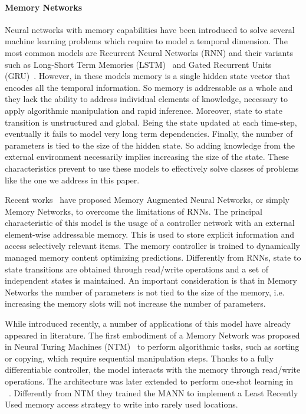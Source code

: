 \documentclass[10pt,twocolumn,letterpaper]{article}
\begin{document}
\paragraph{Memory Networks}
Neural networks with memory capabilities have been introduced to solve several machine learning problems which require to model a temporal dimension. The most common models are Recurrent Neural Networks (RNN) and their variants such as Long-Short Term Memories (LSTM)~\cite{hochreiter1997long} and Gated Recurrent Units (GRU)~\cite{cho2014learning}.
However, in these models memory is a single hidden state vector that encodes all the temporal information. So memory is addressable as a whole and they lack the ability to address individual elements of knowledge, necessary to apply algorithmic manipulation and rapid inference. Moreover, state to state transition is unstructured and global. Being the state updated at each time-step, eventually it fails to model very long term dependencies. Finally, the number of parameters is tied to the size of the hidden state. So adding knowledge from the external environment necessarily implies increasing the size of the state.
These characteristics prevent to use these models to effectively solve classes of problems like the one we address in this paper.

Recent works~\cite{kaiser2017learning, graves2014neural, santoro2016meta, sukhbaatar2015end, weston2014memory, rebuffi2017icarl, kumar2016ask, ma2018visual, yang2018learning, cai2018memory, vinyals2016matching, pritzel2017neural, xu2017few} have proposed Memory Augmented Neural Networks, or simply Memory Networks, to overcome the limitations of RNNs. The principal characteristic of this model is the usage of a controller network with an external element-wise addressable memory. This is used  to store explicit information and access selectively relevant items. The memory controller is trained to dynamically managed memory content optimizing predictions.  Differently from RNNs, state to state transitions are obtained through read/write operations and a set of independent states is maintained. An important consideration is that in Memory Networks the number of parameters is not tied to the size of the memory, i.e. increasing the memory slots will not increase the number of parameters. 

While introduced recently, a number of applications of this model have already appeared in literature. The first embodiment of a Memory Network was proposed in Neural Turing Machines (NTM)~\cite{graves2014neural} to perform algorithmic tasks, such as sorting or copying, which require sequential manipulation steps. Thanks to a fully differentiable controller, the model interacts with the memory through read/write operations. The architecture was later extended to perform one-shot learning in ~\cite{santoro2016meta}. Differently from NTM they trained the MANN to implement a Least Recently Used memory access strategy to write into rarely used locations.
\end{document}
